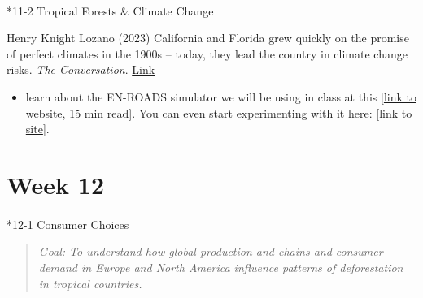 \documentclass[
  10pt,
  letterpaper,
  oneside,
  open=any]{scrbook}
\makeatletter
\let\oldparagraph\paragraph
\renewcommand{\paragraph}{
    \@ifstar
      \xxxParagraphStar
      \xxxParagraphNoStar
  }
\newcommand{\xxxParagraphStar}[1]{\oldparagraph*{#1}\mbox{}}
\newcommand{\xxxParagraphNoStar}[1]{\oldparagraph{#1}\mbox{}}
\providecommand{\tightlist}{%
  \setlength{\itemsep}{0pt}\setlength{\parskip}{0pt}}
\makeatother
\begin{document}
\paragraph*{11-2 Tropical Forests \& Climate
Change}\label{tropical-forests-climate-change}

Henry Knight Lozano (2023) California and Florida grew quickly on the
promise of perfect climates in the 1900s -- today, they lead the country
in climate change risks. \emph{The Conversation}.
\href{https://theconversation.com/california-and-florida-grew-quickly-on-the-promise-of-perfect-climates-in-the-1900s-today-they-lead-the-country-in-climate-change-risks-207470}{Link}

\begin{itemize}
\tightlist
\item
  learn about the EN-ROADS simulator we will be using in class at this
  {[}\href{https://www.climateinteractive.org/en-roads/}{link to
  website}, 15 min read{]}. You can even start experimenting with it
  here:
  {[}\href{https://en-roads.climateinteractive.org/scenario.html?v=22.8.0}{link
  to site}{]}.
\end{itemize}

\section*{Week 12}\label{week-12}


\paragraph*{12-1 Consumer Choices}\label{consumer-choices}

\begin{quote}
\emph{Goal: To understand how global production and chains and consumer
demand in Europe and North America influence patterns of deforestation
in tropical countries.}
\end{quote}
\end{document}
